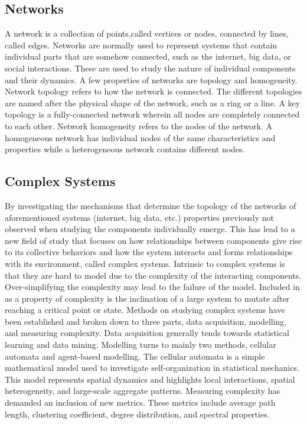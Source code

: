 \subsection{Networks}
A network is a collection of points,called  vertices or nodes, connected by lines, called edges.
Networks are normally used to represent systems that contain individual parts that are somehow connected, such as the internet, big data, or social interactions. These are used to study the nature of individual components and their dynamics.
A few properties of networks are topology and homogeneity. 
Network topology refers to how the network is connected. 
The different topologies are named after the  physical shape of the network, such as a ring or a line.
A key topology is a fully-connected network wherein all nodes are completely connected to each other.
Network homogeneity refers to the nodes of the network. A homogeneous network has individual nodes of the same characteristics and properties while a heterogeneous network contains different nodes.

\subsection{Complex Systems}
By investigating the mechanisms that determine the topology of the networks of aforementioned systems (internet, big data, etc.) properties previously not observed when studying the components individually emerge. 
This has lead to a new field of study that focuses on how relationships between components give rise to its collective behaviors and how the system interacts and forms relationships with its environment, called complex systems.
Intrinsic to complex systems is that they are hard to model due to the complexity of the interacting components.
Over-simplifying the complexity may lead to the failure of the model.
Included in as a property of complexity is the inclination of a large system to mutate after reaching a critical point or state.
Methods on studying complex systems have been established and broken down to three parts, data acquisition, modelling, and measuring complexity.
Data acquisition generally tends towards statistical learning and data mining. 
Modelling turns to mainly two methods, cellular automata and agent-based modelling.
The cellular automata is a simple mathematical model used to investigate self-organization in statistical mechanics. 
This model represents spatial dynamics and highlights local interactions, spatial heterogeneity, and large-scale aggregate patterns.
Measuring complexity has demanded an inclusion of new metrics.
These metrics include average path length, clustering coefficient, degree distribution, and spectral properties.


